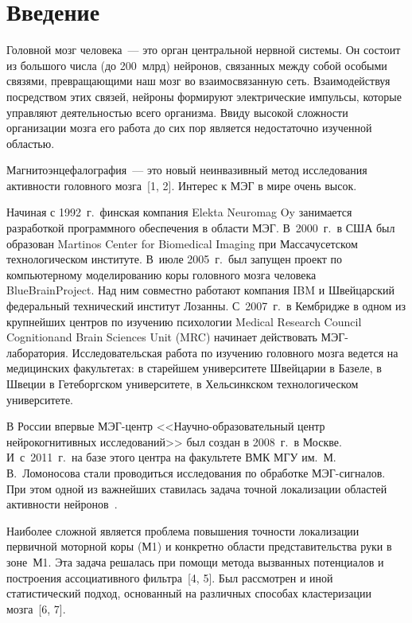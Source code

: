       \begin{multicols}{2}

            \label{st\stat}

\section{Введение}
Головной мозг человека~--- это орган центральной нервной системы. Он
состоит из большого числа (до 200~млрд) нейронов, связанных
между собой особыми связями, превращающими наш мозг во
взаимосвязанную сеть. Взаимодействуя посредством этих связей,
нейроны формируют электрические импульсы, которые управляют
деятельностью всего организма. Ввиду высокой сложности организации
мозга его работа до сих пор является недостаточно изученной
областью.

Магнитоэнцефалография~--- это новый неинвазивный метод исследования
активности головного мозга~[1, 2]. Интерес к МЭГ в
мире очень высок.

Начиная с 1992~г.\ финская компания Elekta Neuromag Oy занимается
разработкой программного обеспечения в области МЭГ.
В~2000~г.\ в США был образован Martinos Center for
Biomedical Imaging при Массачусетском технологическом институте.
В~июле 2005~г.\ был запущен проект по компьютерному моделированию
коры головного мозга человека BlueBrainProject. Над ним совместно
работают компания IBM и Швейцарский федеральный технический институт
Лозанны. С~2007~г.\ в Кембридже в одном из крупнейших центров по
изучению психологии Medical Research Council Cognitionand Brain
Sciences Unit (MRC) начинает действовать МЭГ-ла\-бо\-ра\-то\-рия.
Исследовательская работа по изучению головного мозга ведется на
медицинских факультетах: в старейшем университете Швейцарии в
Базеле, в Швеции в Гетеборгском университете, в Хельсинкском
технологическом университете.

В России впервые МЭГ-центр <<На\-уч\-но-обра\-зо\-ва\-тель\-ный центр
нейрокогнитивных исследований>> был создан в 2008~г.\ в Москве.
И~с~2011~г.\ на базе этого центра на факультете ВМК МГУ им.\
М.\,В.~Ломоносова стали проводиться исследования по обработке
МЭГ-сиг\-на\-лов. При этом одной из важнейших ставилась задача точной
локализации областей активности нейронов~\cite{friston}.

Наиболее сложной является проблема повышения точности локализации
первичной моторной коры (М1) и конкретно области представительства
руки в зоне~М1. Эта задача решалась при помощи метода вызванных
потенциалов и построения ассоциативного фильтра~[4, 5]. Был
рассмотрен и иной статистический подход, основанный на различных
способах кластеризации мозга~[6, 7].


\end{multicols}
